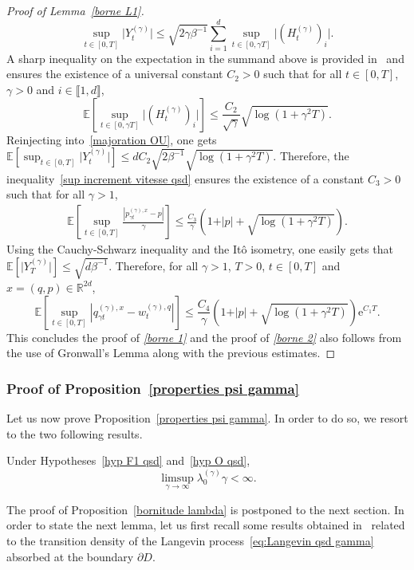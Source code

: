 \documentclass[preprint,EJP]{ejpecp}
\begin{document}
\begin{proof}[Proof of Lemma~\ref{borne L1}]
\begin{equation}\label{majoration OU}
    \sup_{t\in[0,T]} \vert Y_t^{(\gamma)}\vert\leq\sqrt{2\gamma\beta^{-1}}\sum_{i=1}^d\sup_{t\in[0,\gamma T]}\vert(H^{(\gamma)}_{t})_i\vert.
\end{equation}
A sharp inequality on the expectation in the summand above is provided in~\cite{IneqOU} and ensures the existence of a universal constant $C_2>0$ such that for all $t\in[0,T]$, $\gamma>0$ and $i\in\llbracket 1,d\rrbracket$,
$$\mathbb{E}\left[\sup_{t\in[0,\gamma T]}\vert(H^{(\gamma)}_{t})_i\vert\right]\leq \frac{C_2}{\sqrt{\gamma}}\sqrt{\log(1+\gamma^2T)}.$$
Reinjecting into~\eqref{majoration OU}, one gets $\mathbb{E}[\sup_{t\in[0,T]} \vert Y_t^{(\gamma)}\vert]\leq dC_2\sqrt{2\beta^{-1}}\sqrt{\log(1+\gamma^2T)}$. Therefore, the inequality~\eqref{sup increment vitesse qsd} ensures the existence of a constant $C_3>0$ such that for all $\gamma>1$, 
\begin{align*}
    \mathbb{E}\left[\sup_{t\in[0,T]} \frac{\left\vert p^{(\gamma),x}_{\gamma t}-p\right\vert}{\gamma}\right]\leq \frac{C_3}{\gamma}\left(1+\vert p\vert+ \sqrt{\log(1+\gamma^2T)}\right).
\end{align*}
Using the Cauchy-Schwarz inequality and the Itô isometry, one easily gets that $\mathbb{E}[\vert Y_T^{(\gamma)}\vert]\leq\sqrt{d\beta^{-1}}$. Therefore, for all $\gamma>1$, $T>0$, $t\in[0,T]$ and $x=(q,p)\in\mathbb{R}^{2d}$,
$$\mathbb{E}\left[\sup_{t\in[0,T]}\left\vert q^{(\gamma),x}_{\gamma t}-w^{(\gamma),q}_{t}\right\vert\right]\leq\frac{C_4}{\gamma}\left(1+\vert p\vert+ \sqrt{\log(1+\gamma^2T)}\right)\mathrm{e}^{C_1T}.$$ 
This concludes the proof of \emph{\eqref{borne 1}} and the proof of \emph{\eqref{borne 2}} also follows from the use of Gronwall's Lemma along with the previous estimates. 
\end{proof}
\subsubsection{Proof of Proposition~\ref{properties psi gamma}}
Let us now prove Proposition~\ref{properties psi gamma}. In order to do so, we resort to the two following results.
\begin{proposition}\label{bornitude lambda} Under Hypotheses~\ref{hyp F1 qsd} and~\ref{hyp O qsd},
\begin{equation}\label{borne lambda}
    \limsup_{\gamma\rightarrow\infty} \lambda_0^{(\gamma)}\gamma<\infty.
\end{equation} 
\end{proposition}
The proof of Proposition~\ref{bornitude lambda} is postponed to the next section. 
In order to state the next lemma, let us first recall some results obtained in~\cite{LelRamRey} related to the transition density of the Langevin process~\eqref{eq:Langevin qsd gamma} absorbed at the boundary $\partial D$. 
 
\end{document}
